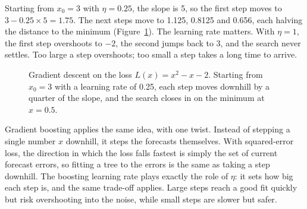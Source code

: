Starting from $x_0 = 3$ with $\eta = 0.25$, the slope is 5, so the first step moves to $3 - 0.25 \times 5 = 1.75$. The next steps move to 1.125, 0.8125 and 0.656, each halving the distance to the minimum (Figure~\ref{fig:21-gd}). The learning rate matters. With $\eta = 1$, the first step overshoots to $-2$, the second jumps back to 3, and the search never settles. Too large a step overshoots; too small a step takes a long time to arrive.

\begin{figure}[htbp]
  \centering
  \caption{Gradient descent on the loss $L(x) = x^2 - x - 2$. Starting from
    $x_0 = 3$ with a learning rate of 0.25, each step moves downhill by a
    quarter of the slope, and the search closes in on the minimum at
    $x = 0.5$.}
  \label{fig:21-gd}
\end{figure}

Gradient boosting applies the same idea, with one twist. Instead of stepping a single number $x$ downhill, it steps the forecasts themselves. With squared-error loss, the direction in which the loss falls fastest is simply the set of current forecast errors, so fitting a tree to the errors is the same as taking a step downhill. The boosting learning rate plays exactly the role of $\eta$: it sets how big each step is, and the same trade-off applies. Large steps reach a good fit quickly but risk overshooting into the noise, while small steps are slower but safer.

